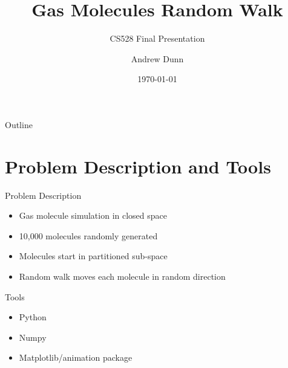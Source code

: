 \documentclass{if-beamer}
\title[CS528 Final Presentation]{Gas Molecules Random Walk}
\subtitle{CS528 Final Presentation}
\author{Andrew Dunn}
\institute[CWU CS]{
  Department of Computer Science\\
  Central Washington University
}
\date{\today}
\begin{document}
\begin{frame}
  \titlepage
\end{frame}

\begin{frame}{Outline}
  \tableofcontents
\end{frame}

\section{Problem Description and Tools}

\begin{frame}{Problem Description}
  \begin{itemize}
  	\item Gas molecule simulation in closed space
  	\item 10,000 molecules randomly generated
  	\item Molecules start in partitioned sub-space
  	\item Random walk moves each molecule in random direction
  \end{itemize}
\end{frame}


\begin{frame}{Tools}
  \begin{itemize}
  	\item Python
  	\item Numpy
    \item Matplotlib/animation package
  \end{itemize}
\end{frame}
\end{document}
